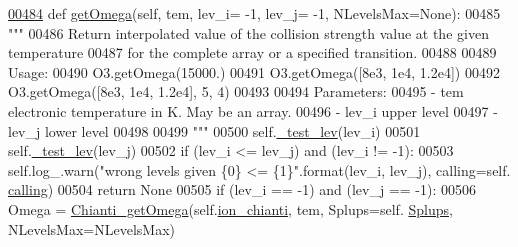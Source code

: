 \begin{DoxyCode}
\hypertarget{classpyneb_1_1utils_1_1pn__chianti_1_1___coll_chianti_l00484}{}\hyperlink{classpyneb_1_1utils_1_1pn__chianti_1_1___coll_chianti_a8dd1bccc8974d0b3a44f03658e993b08}{00484}     \textcolor{keyword}{def }\hyperlink{classpyneb_1_1utils_1_1pn__chianti_1_1___coll_chianti_a8dd1bccc8974d0b3a44f03658e993b08}{getOmega}(self, tem, lev\_i= -1, lev\_j= -1, NLevelsMax=None):
00485         \textcolor{stringliteral}{"""}
00486 \textcolor{stringliteral}{        Return interpolated value of the collision strength value at the given temperature }
00487 \textcolor{stringliteral}{            for the complete array or a specified transition.}
00488 \textcolor{stringliteral}{}
00489 \textcolor{stringliteral}{        Usage:}
00490 \textcolor{stringliteral}{            O3.getOmega(15000.)}
00491 \textcolor{stringliteral}{            O3.getOmega([8e3, 1e4, 1.2e4])}
00492 \textcolor{stringliteral}{            O3.getOmega([8e3, 1e4, 1.2e4], 5, 4)}
00493 \textcolor{stringliteral}{        }
00494 \textcolor{stringliteral}{        Parameters:}
00495 \textcolor{stringliteral}{            - tem    electronic temperature in K. May be an array.}
00496 \textcolor{stringliteral}{            - lev\_i  upper level}
00497 \textcolor{stringliteral}{            - lev\_j  lower level}
00498 \textcolor{stringliteral}{}
00499 \textcolor{stringliteral}{        """}
00500         self.\hyperlink{classpyneb_1_1utils_1_1pn__chianti_1_1___coll_chianti_ab0418def377c8054aded2bfb3055a40f}{\_test\_lev}(lev\_i)
00501         self.\hyperlink{classpyneb_1_1utils_1_1pn__chianti_1_1___coll_chianti_ab0418def377c8054aded2bfb3055a40f}{\_test\_lev}(lev\_j)
00502         \textcolor{keywordflow}{if} (lev\_i <= lev\_j) \textcolor{keywordflow}{and} (lev\_i != -1):
00503             self.log\_.warn(\textcolor{stringliteral}{"wrong levels given \{0\} <= \{1\}"}.format(lev\_i, lev\_j), calling=self.
      \hyperlink{classpyneb_1_1utils_1_1pn__chianti_1_1___coll_chianti_ab58a9cfcb76b7c72b9b815c5700e7aae}{calling})
00504             \textcolor{keywordflow}{return} \textcolor{keywordtype}{None}            
00505         \textcolor{keywordflow}{if} (lev\_i == -1) \textcolor{keywordflow}{and} (lev\_j == -1):
00506             Omega = \hyperlink{namespacepyneb_1_1utils_1_1pn__chianti_a651b939729d0f5afb817a47a974bfaa1}{Chianti\_getOmega}(self.\hyperlink{classpyneb_1_1utils_1_1pn__chianti_1_1___coll_chianti_af0f28fb84d1ceb9d64e40429c981a6f6}{ion\_chianti}, tem, Splups=self.
      \hyperlink{classpyneb_1_1utils_1_1pn__chianti_1_1___coll_chianti_abbdbf5533a480f46baceccc2885d7467}{Splups}, NLevelsMax=NLevelsMax)

\end{DoxyCode}
